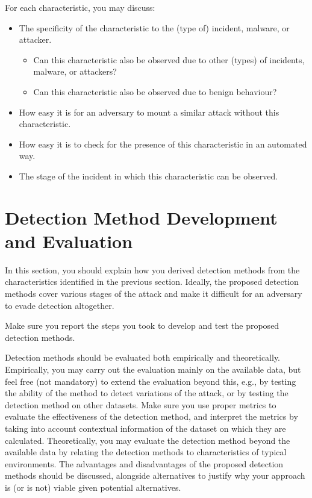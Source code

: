 For each characteristic, you may discuss:

\begin{itemize}
    \item The specificity of the characteristic to the (type of) incident, malware, or attacker.
    \begin{itemize}
        \item Can this characteristic also be observed due to other (types) of incidents, malware, or attackers?
        \item Can this characteristic also be observed due to benign behaviour?
    \end{itemize}
    \item How easy it is for an adversary to mount a similar attack without this characteristic.
    \item How easy it is to check for the presence of this characteristic in an automated way.
    \item The stage of the incident in which this characteristic can be observed.
\end{itemize}

\section{Detection Method Development and Evaluation} \label{section: detection method development and evaluation}

In this section, you should explain how you derived detection methods from the characteristics identified in the previous section. 
Ideally, the proposed detection methods cover various stages of the attack and make it difficult for an adversary to evade detection altogether. 

Make sure you report the steps you took to develop and test the proposed detection methods.

Detection methods should be evaluated both empirically and theoretically.
Empirically, you may carry out the evaluation mainly on the available data, but feel free (not mandatory) to extend the evaluation beyond this, e.g., by testing the ability of the method to detect variations of the attack, or by testing the detection method on other datasets. 
Make sure you use proper metrics to evaluate the effectiveness of the detection method, and interpret the metrics by taking into account contextual information of the dataset on which they are calculated. Theoretically, you may evaluate the detection method beyond the available data by relating the detection methods to characteristics of typical environments.
The advantages and disadvantages of the proposed detection methods should be discussed, alongside alternatives to justify why your approach is (or is not) viable given potential alternatives.



